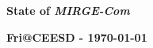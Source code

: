 \def\CC{{C\nolinebreak[4]\hspace{-.05em}\raisebox{.4ex}{\tiny\bf ++}}}

\begin{frame}\frametitle{}
\vspace*{0.2in}
\centerline{\textrm{{\huge\bfseries\color{myOrange} State of \textit{MIRGE-Com}}}}
\smallskip
\centerline{\textrm{{\large\bfseries{Fri@CEESD - \today}}}}
\vspace*{0.2in}
\begin{center}
\vspace*{0.4in}
\end{center}
\end{frame}

